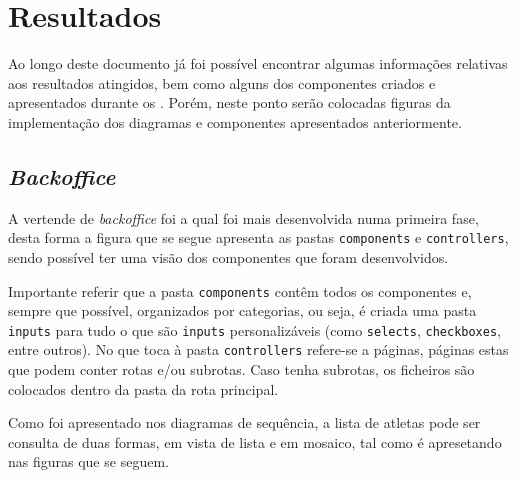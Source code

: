 \chapter{Resultados}

Ao longo deste documento já foi possível encontrar algumas informações relativas aos resultados atingidos, bem como alguns dos componentes criados e apresentados durante os . Porém, neste ponto serão colocadas figuras da implementação dos diagramas e componentes apresentados anteriormente.

\section{\textit{Backoffice}}

A vertende de \textit{backoffice} foi a qual foi mais desenvolvida numa primeira fase, desta forma a figura que se segue apresenta as pastas \texttt{components} e \texttt{controllers}, sendo possível ter uma visão dos componentes que foram desenvolvidos.

Importante referir que a pasta \texttt{components} contêm todos os componentes e, sempre que possível, organizados por categorias, ou seja, é criada uma pasta \texttt{inputs} para tudo o que são \texttt{inputs} personalizáveis (como \texttt{selects}, \texttt{checkboxes}, entre outros). No que toca à pasta \texttt{controllers} refere-se a páginas, páginas estas que podem conter rotas e/ou subrotas. Caso tenha subrotas, os ficheiros são colocados dentro da pasta da rota principal.

\clearpage

\begin{minipage}[t]{0.45\textwidth}
\end{minipage}
\begin{minipage}[t]{0.45\textwidth}
\end{minipage}

Como foi apresentado nos diagramas de sequência, a lista de atletas pode ser consulta de duas formas, em vista de lista e em mosaico, tal como é apresetando nas figuras que se seguem.

\begin{minipage}[t]{0.45\textwidth}
\end{minipage}
\begin{minipage}[t]{0.45\textwidth}
\end{minipage}

